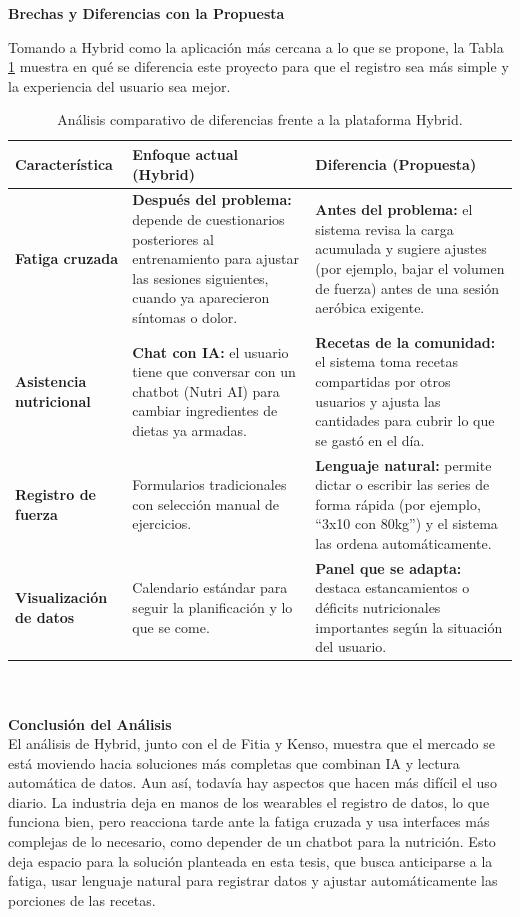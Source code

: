 \textbf{Brechas y Diferencias con la Propuesta}

Tomando a Hybrid como la aplicación más cercana a lo que se propone, la Tabla \ref{tab:analisis_hybrid} muestra en qué se diferencia este proyecto para que el registro sea más simple y la experiencia del usuario sea mejor.
\\
\begin{table}[h!]
    \centering
    \renewcommand{\arraystretch}{1.5}
    \begin{tabular}{|m{3.5cm}|m{5.5cm}|m{5.5cm}|}
        \hline
        \rowcolor[HTML]{EFEFEF}
        \textbf{Característica} & \textbf{Enfoque actual (Hybrid)} & \textbf{Diferencia (Propuesta)} \\ \hline
        \textbf{Fatiga cruzada} & \textbf{Después del problema:} depende de cuestionarios posteriores al entrenamiento para ajustar las sesiones siguientes, cuando ya aparecieron síntomas o dolor. & \textbf{Antes del problema:} el sistema revisa la carga acumulada y sugiere ajustes (por ejemplo, bajar el volumen de fuerza) antes de una sesión aeróbica exigente. \\ \hline
        \textbf{Asistencia nutricional} & \textbf{Chat con IA:} el usuario tiene que conversar con un chatbot (Nutri AI) para cambiar ingredientes de dietas ya armadas. & \textbf{Recetas de la comunidad:} el sistema toma recetas compartidas por otros usuarios y ajusta las cantidades para cubrir lo que se gastó en el día. \\ \hline
        \textbf{Registro de fuerza} & Formularios tradicionales con selección manual de ejercicios. & \textbf{Lenguaje natural:} permite dictar o escribir las series de forma rápida (por ejemplo, ``3x10 con 80kg'') y el sistema las ordena automáticamente. \\ \hline
        \textbf{Visualización de datos} & Calendario estándar para seguir la planificación y lo que se come. & \textbf{Panel que se adapta:} destaca estancamientos o déficits nutricionales importantes según la situación del usuario. \\ \hline
    \end{tabular}
    \caption{Análisis comparativo de diferencias frente a la plataforma Hybrid.}
    \label{tab:analisis_hybrid}
\end{table}
\\\\
\textbf{Conclusión del Análisis}
\\
El análisis de Hybrid, junto con el de Fitia y Kenso, muestra que el mercado se está moviendo hacia soluciones más completas que combinan IA y lectura automática de datos. Aun así, todavía hay aspectos que hacen más difícil el uso diario. La industria deja en manos de los wearables el registro de datos, lo que funciona bien, pero reacciona tarde ante la fatiga cruzada y usa interfaces más complejas de lo necesario, como depender de un chatbot para la nutrición. Esto deja espacio para la solución planteada en esta tesis, que busca anticiparse a la fatiga, usar lenguaje natural para registrar datos y ajustar automáticamente las porciones de las recetas.
